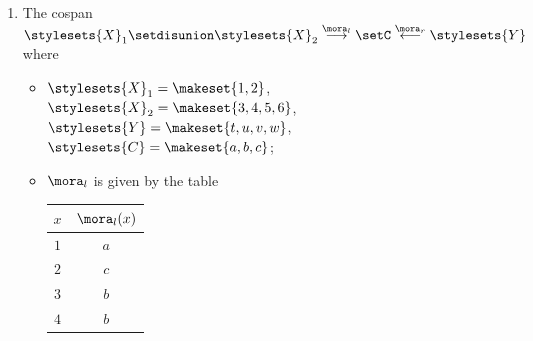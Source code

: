 {\begin{gradedexercise}
\begin{enumerate}
              \begin{itemize}
                  \item $\stylesets{X}_1 = \makeset{1, 2}$, $\stylesets{X}_2 = \makeset{3, 4}$, $\stylesets{X}_3 = \makeset{5, 6}$, $\stylesets{Y} = \emptyset$, $\stylesets{C} = \makeset{a, b, c}$;
                  \item $\mora_l$ is given by the table
                        \begin{center}
                            \begin{tabular}{c|c}
                                $x$ & $\mora_l(x)$ \\
                                \hline
                                $1$ & $b$ \\
                                $2$ & $a$ \\
                                $3$ & $a$ \\
                                $4$ & $c$ \\
                                $5$ & $c$ \\
                                $6$ & $b$
                            \end{tabular}
                        \end{center}
              \end{itemize}
        \item The cospan $\stylesets{X}_1 \setdisunion \stylesets{X}_2 \overset{\mora_l}{\longrightarrow} \setC \overset{\mora_r}{\longleftarrow} \stylesets{Y}$ where
              \begin{itemize}
                  \item $\stylesets{X}_1 = \makeset{1, 2}$, $\stylesets{X}_2 = \makeset{3, 4, 5, 6}$, $\stylesets{Y} = \makeset{t, u, v, w}$, $\stylesets{C} = \makeset{a, b, c}$;
                  \item $\mora_l$ is given by the table
                        \begin{center}
                            \begin{tabular}{c|c}
                                $x$ & $\mora_l(x)$ \\
                                \hline
                                $1$ & $a$ \\
                                $2$ & $c$ \\
                                $3$ & $b$ \\
                                $4$ & $b$ \\

\end{tabular}
\end{center}
\end{itemize}
\end{enumerate}
\end{gradedexercise}}

